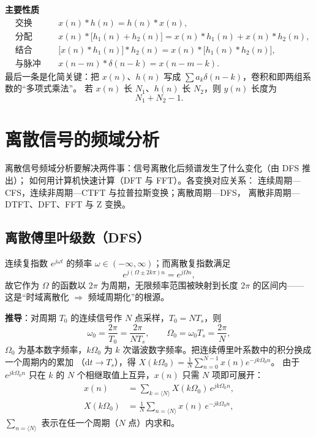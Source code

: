 \textbf{主要性质}
\begin{align}
&\text{交换律：} && x(n)*h(n)=h(n)*x(n),\\
&\text{分配律：} && x(n)*\big[h_1(n)+h_2(n)\big]=x(n)*h_1(n)+x(n)*h_2(n),\\
&\text{结合律：} && \big[x(n)*h_1(n)\big]*h_2(n)=x(n)*\big[h_1(n)*h_2(n)\big],\\
&\text{与脉冲卷积：} && x(n-m)*\delta(n-k)=x(n-m-k).
\end{align}
最后一条是化简关键：把 $x(n)$、$h(n)$ 写成 $\sum a_k\delta(n-k)$，卷积和即两组系数的“多项式乘法”。
若 $x(n)$ 长 $N_1$、$h(n)$ 长 $N_2$，则 $y(n)$ 长度为
\begin{equation}
N_1+N_2-1 .
\end{equation}

\section{离散信号的频域分析}

离散信号频域分析要解决两件事：信号离散化后频谱发生了什么变化（由 DFS 推出）；
如何用计算机快速计算（DFT 与 FFT）。各变换对应关系：
连续周期—CFS，连续非周期—CTFT 与拉普拉斯变换；离散周期—DFS，
离散非周期—DTFT、DFT、FFT 与 Z 变换。

\subsection{离散傅里叶级数（DFS）}

连续复指数 $e^{j\omega t}$ 的频率 $\omega\in(-\infty,\infty)$；而离散复指数满足
\begin{equation}
e^{j(\Omega\pm2k\pi)n}=e^{j\Omega n},
\end{equation}
故它作为 $\Omega$ 的函数以 $2\pi$ 为周期，无限频率范围被映射到长度 $2\pi$ 的区间内——
这是“时域离散化 $\Rightarrow$ 频域周期化”的根源。

\textbf{推导}：对周期 $T_0$ 的连续信号作 $N$ 点采样，$T_0=NT_s$，则
\begin{equation}
\omega_0=\frac{2\pi}{T_0}=\frac{2\pi}{NT_s},\qquad
\Omega_0=\omega_0T_s=\frac{2\pi}{N},
\end{equation}
$\Omega_0$ 为基本数字频率，$k\Omega_0$ 为 $k$ 次谐波数字频率。把连续傅里叶系数中的积分换成一个周期内的累加
（$\mathrm{d}t\to T_s$），得 $X(k\Omega_0)=\frac{1}{N}\sum_{n=0}^{N-1}x(n)e^{-jk\Omega_0n}$。
由于 $e^{jk\Omega_0n}$ 只在 $k$ 的 $N$ 个相继取值上互异，$x(n)$ 只需 $N$ 项即可展开：
\begin{align}
x(n)&=\sum_{k=\langle N\rangle}X(k\Omega_0)\,e^{jk\Omega_0 n},\\
X(k\Omega_0)&=\frac{1}{N}\sum_{n=\langle N\rangle}x(n)\,e^{-jk\Omega_0 n},
\end{align}
$\sum\limits_{n=\langle N\rangle}$ 表示在任一个周期（$N$ 点）内求和。

